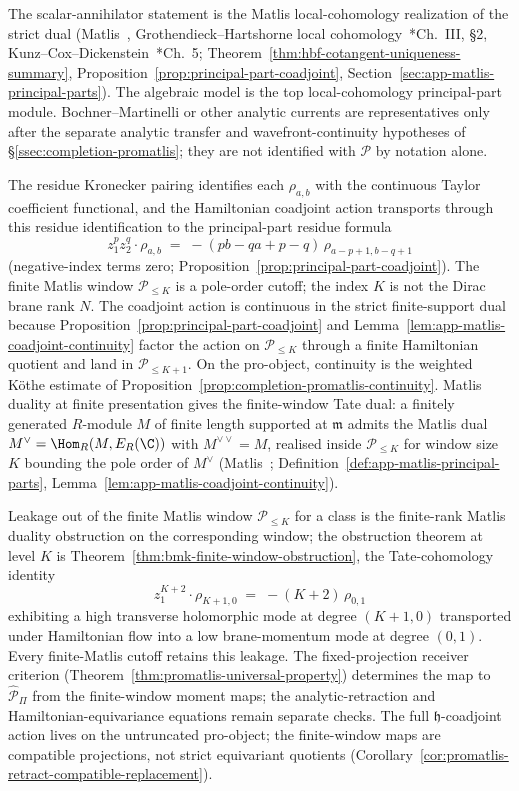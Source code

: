 \documentclass[11pt]{memoir}
\begin{document}
The scalar-annihilator statement is the Matlis local-cohomology
realization of the strict dual
(Matlis~\cite{matlis-injective}, Grothendieck--Hartshorne local
cohomology~\cite{hartshorne-local-cohomology}*{Ch.~III, \S2},
Kunz--Cox--Dickenstein~\cite{kunz-residues-duality}*{Ch.~5};
Theorem~\ref{thm:hbf-cotangent-uniqueness-summary},
Proposition~\ref{prop:principal-part-coadjoint},
Section~\ref{sec:app-matlis-principal-parts}).  The algebraic model is
the top local-cohomology principal-part module.  Bochner--Martinelli or
other analytic currents are representatives only after the separate
analytic transfer and wavefront-continuity hypotheses of
\S\ref{ssec:completion-promatlis}; they are not identified with
\(\mathcal P\) by notation alone.

The residue Kronecker pairing identifies each \(\rho_{a,b}\) with the
continuous Taylor coefficient functional, and the Hamiltonian coadjoint
action transports through this residue identification to the
principal-part residue formula
\[
  z_1^pz_2^q\cdot\rho_{a,b}
    \;=\;-(pb-qa+p-q)\,\rho_{a-p+1,b-q+1}
\]
(negative-index terms zero;
Proposition~\ref{prop:principal-part-coadjoint}).  The finite Matlis
window \(\mathcal P_{\le K}\) is a pole-order cutoff; the index \(K\) is
not the Dirac brane rank \(N\).  The coadjoint action is continuous in
the strict finite-support dual because
Proposition~\ref{prop:principal-part-coadjoint} and
Lemma~\ref{lem:app-matlis-coadjoint-continuity} factor the action on
\(\mathcal P_{\le K}\) through a finite Hamiltonian quotient and land in
\(\mathcal P_{\le K+1}\).  On the pro-object, continuity is the weighted
K\"othe estimate of
Proposition~\ref{prop:completion-promatlis-continuity}.
Matlis duality at finite presentation gives the
finite-window Tate dual: a finitely generated \(R\)-module \(M\) of
finite length supported at \(\mathfrak m\) admits the Matlis dual
\(M^\vee=\Hom_R(M,E_R(\C))\) with \(M^{\vee\vee}=M\), realised inside
\(\mathcal P_{\le K}\) for window size \(K\) bounding the pole order
of \(M^\vee\) (Matlis~\cite{matlis-injective};
Definition~\ref{def:app-matlis-principal-parts},
Lemma~\ref{lem:app-matlis-coadjoint-continuity}).

Leakage out of the finite Matlis window \(\mathcal P_{\le K}\) for a
class is the finite-rank Matlis duality obstruction on the
corresponding window; the obstruction theorem at level \(K\) is
Theorem~\ref{thm:bmk-finite-window-obstruction}, the Tate-cohomology
identity
\[
  z_1^{K+2}\cdot\rho_{K+1,0}
    \;=\;-(K+2)\,\rho_{0,1}
\]
exhibiting a high transverse holomorphic mode at degree \((K+1,0)\)
transported under Hamiltonian flow into a low brane-momentum mode at
degree \((0,1)\).  Every finite-Matlis cutoff retains this leakage.  The
fixed-projection receiver criterion
(Theorem~\ref{thm:promatlis-universal-property}) determines the map to
\(\widehat{\mathcal P}_\Pi\) from the finite-window moment maps; the
analytic-retraction and Hamiltonian-equivariance equations remain
separate checks.  The full \(\mathfrak h\)-coadjoint action
lives on the untruncated pro-object; the finite-window maps are
compatible projections, not strict equivariant quotients
(Corollary~\ref{cor:promatlis-retract-compatible-replacement}).
\end{document}
